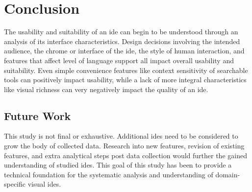 \section{Conclusion}
\label{sec:conclusion}

The usability and suitability of an \acl{ide} can begin to be understood
through an analysis of its interface characteristics. Design decisions
involving the intended audience, the chrome or interface of the \ac{ide},
the style of human interaction, and features that affect level of language
support all impact overall usability and suitability. Even simple
convenience features like context sensitivity of searchable tools can
positively impact usability, while a lack of more integral characteristics
like visual richness can very negatively impact the quality of an \ac{ide}.

\subsection{Future Work}
\label{subsec:future_work}

This study is not final or exhaustive. Additional \acp{ide} need to be
considered to grow the body of collected data. Research into new features,
revision of existing features, and extra analytical steps post data
collection would further the gained understanding of studied \acp{ide}.
This goal of this study has been to provide a technical foundation for the
systematic analysis and understanding of domain-specific visual \acp{ide}.
